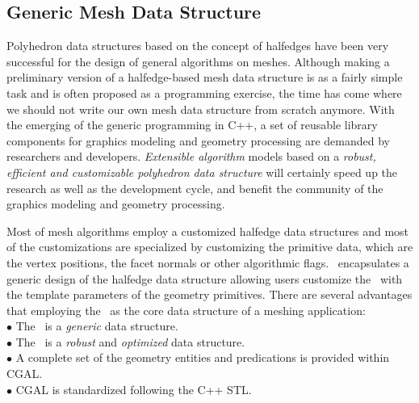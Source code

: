 \documentclass[letter]{article}
\begin{document}
\subsection*{Generic Mesh Data Structure}
Polyhedron data structures based on the concept of
halfedges have been very successful for the design
of general algorithms on meshes. 
Although making a preliminary version of a halfedge-based mesh data
structure is as a fairly simple task and is often proposed as a
programming exercise, the time has come where we should not write our
own mesh data structure from scratch anymore. With the emerging of
the generic programming in C++, a set of reusable library
components for graphics modeling and geometry processing are demanded
by researchers and developers. \emph{Extensible algorithm} models based on
a \emph{robust, efficient and customizable polyhedron 
data structure} will certainly speed up
the research as well as the development cycle, and benefit the 
community of the graphics modeling and geometry processing.  

Most of mesh algorithms employ a customized 
halfedge data structures and most of the customizations 
are specialized by customizing the primitive data, 
which are the vertex positions, the facet normals or other 
algorithmic flags. \cgalpoly\ encapsulates a generic
design of the halfedge data structure allowing users
customize the \poly\ with the template parameters of
the geometry primitives. There are several advantages
that employing the \poly\ as the core data structure
of a meshing application: \\
\indent $\bullet$ The \poly\ is a \emph{generic} data structure.\\
\indent $\bullet$ The \poly\ is a \emph{robust} and \emph{optimized} 
data structure.\\
\indent $\bullet$ A complete set of the geometry entities and predications 
is provided within CGAL.\\
\indent $\bullet$ CGAL is standardized following the C++ STL.
\end{document}
